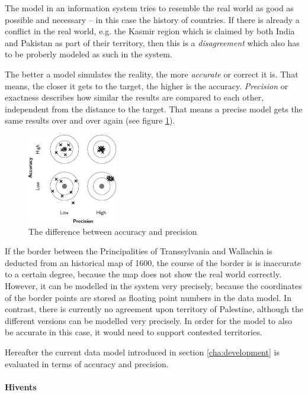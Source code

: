 The model in an information system tries to resemble the real world as good as possible and necessary -- in this case the history of countries. If there is already a conflict in the real world, e.g. the Kasmir region which is claimed by both India and Pakistan as part of their territory, then this is a \emph{disagreement} which also has to be proberly modeled as such in the system.

The better a model simulates the reality, the more \emph{accurate} or correct it is. That means, the closer it gets to the target, the higher is the accuracy. \emph{Precision} or exactness describes how similar the results are compared to each other, independent from the distance to the target. That means a precise model gets the same results over and over again (see figure \ref{fig:accuracy_precision}).

\begin{figure}[ht]
  \centering
  \includegraphics[width = 0.35\textwidth]{graphics/uncertainty/accuracy_precision}
  \caption{The difference between accuracy and precision}
  \label{fig:accuracy_precision}
\end{figure}

If the border between the Principalities of Transsylvania and Wallachia is deducted from an historical map of 1600, the course of the border is is inaccurate to a certain degree, because the map does not show the real world correctly. However, it can be modelled in the system very precisely, because the coordinates of the border points are stored as floating point numbers in the data model. In contrast, there is currently no agreement upon territory of Palestine, although the different versions can be modelled very precisely. In order for the model to also be accurate in this case, it would need to support contested territories.

Hereafter the current data model introduced in section \ref{cha:development}
is evaluated in terms of accuracy and precision.


\paragraph{Hivents} %
\label{par:evaluation_hivents}

